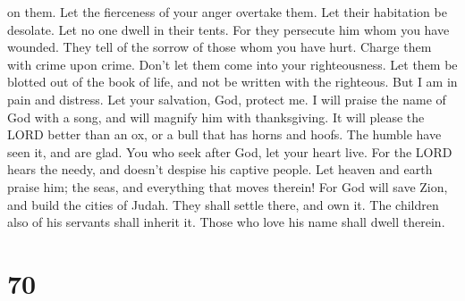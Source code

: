 on them. Let the fierceness of your anger overtake them. 
Let their habitation be desolate. Let no one dwell in their tents.
 For they persecute him whom you have wounded. They tell of
the sorrow of those whom you have hurt.  Charge them with
crime upon crime. Don't let them come into your righteousness.
 Let them be blotted out of the book of life, and not be
written with the righteous.  But I am in pain and distress.
Let your salvation, God, protect me.  I will praise the
name of God with a song, and will magnify him with thanksgiving.
 It will please the LORD better than an ox, or a bull that
has horns and hoofs.  The humble have seen it, and are
glad. You who seek after God, let your heart live.  For the
LORD hears the needy, and doesn't despise his captive people.
 Let heaven and earth praise him; the seas, and everything
that moves therein!  For God will save Zion, and build the
cities of Judah. They shall settle there, and own it.  The
children also of his servants shall inherit it. Those who love his name
shall dwell therein.

\hypertarget{section-68}{%
\section{70}\label{section-68}}

